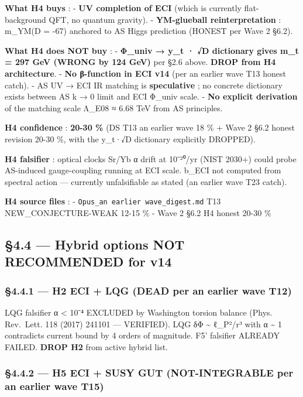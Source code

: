 \documentclass[
  11pt,
  a4paper,
]{article}
\begin{document}
\textbf{What H4 buys} :
- \textbf{UV completion of ECI} (which is currently flat-background QFT, no quantum gravity).
- \textbf{YM-glueball reinterpretation} : m\_YM(D = -67) anchored to AS Higgs prediction (HONEST per Wave 2 §6.2).

\textbf{What H4 does NOT buy} :
- \textbf{Φ\_univ → y\_t · √\textbar D\textbar{} dictionary gives m\_t = 297 GeV (WRONG by 124 GeV)} per §2.6 above. \textbf{DROP from H4 architecture}.
- \textbf{No β-function in ECI v14} (per an earlier wave T13 honest catch).
- AS UV → ECI IR matching is \textbf{speculative} ; no concrete dictionary exists between AS k → 0 limit and ECI Φ\_univ scale.
- \textbf{No explicit derivation} of the matching scale Λ\_E08 ≈ 6.68 TeV from AS principles.

\textbf{H4 confidence} : \textbf{20-30 \%} (DS T13 an earlier wave 18 \% + Wave 2 §6.2 honest revision 20-30 \%, with the y\_t·√\textbar D\textbar{} dictionary explicitly DROPPED).

\textbf{H4 falsifier} : optical clocks Sr/Yb α drift at 10⁻²⁰/yr (NIST 2030+) could probe AS-induced gauge-coupling running at ECI scale. b\_ECI not computed from spectral action --- currently unfalsifiable as stated (an earlier wave T23 catch).

\textbf{H4 source files} :
- \texttt{Opus\_an earlier wave\_digest.md} T13 NEW\_CONJECTURE-WEAK 12-15 \%
- Wave 2 §6.2 H4 honest 20-30 \%

\hypertarget{hybrid-options-not-recommended-for-v14}{%
\subsection{§4.4 --- Hybrid options NOT RECOMMENDED for v14}\label{hybrid-options-not-recommended-for-v14}}

\hypertarget{h2-eci-lqg-dead-per-an earlier wave-t12}{%
\subsubsection{§4.4.1 --- H2 ECI + LQG (DEAD per an earlier wave T12)}\label{h2-eci-lqg-dead-per-an earlier wave-t12}}

LQG falsifier α \textless{} 10⁻⁴ EXCLUDED by Washington torsion balance (Phys. Rev.~Lett. 118 (2017) 241101 --- VERIFIED). LQG δΦ \textasciitilde{} ℓ\_P²/r³ with α \textasciitilde{} 1 contradicts current bound by 4 orders of magnitude. F5' falsifier ALREADY FAILED. \textbf{DROP H2} from active hybrid list.

\hypertarget{h5-eci-susy-gut-not-integrable-per-an earlier wave-t15}{%
\subsubsection{§4.4.2 --- H5 ECI + SUSY GUT (NOT-INTEGRABLE per an earlier wave T15)}\label{h5-eci-susy-gut-not-integrable-per-an earlier wave-t15}}
\end{document}
